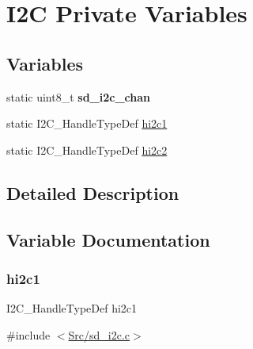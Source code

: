 \hypertarget{group___s_d___i2_c___private___variables}{}\section{I2C Private Variables}
\label{group___s_d___i2_c___private___variables}
\subsection*{Variables}
\begin{DoxyCompactItemize}
\item 
\mbox{\label{group___s_d___i2_c___private___variables_ga7dd7d939b29cc4e7d92bbe2afd68f94a}} 
static uint8\+\_\+t {\bfseries sd\+\_\+i2c\+\_\+chan}
\item 
static I2\+C\+\_\+\+Handle\+Type\+Def \mbox{\hyperlink{group___s_d___i2_c___private___variables_gaf7b2c26e44dadaaa798a5c3d82914ba7}{hi2c1}}
\item 
static I2\+C\+\_\+\+Handle\+Type\+Def \mbox{\hyperlink{group___s_d___i2_c___private___variables_gac379bcc152d860f08b1279fd3e232295}{hi2c2}}
\end{DoxyCompactItemize}


\subsection{Detailed Description}


\subsection{Variable Documentation}
\mbox{\label{group___s_d___i2_c___private___variables_gaf7b2c26e44dadaaa798a5c3d82914ba7}} 
\subsubsection{\texorpdfstring{hi2c1}{hi2c1}}
{\footnotesize\ttfamily I2\+C\+\_\+\+Handle\+Type\+Def hi2c1\hspace{0.3cm}{\ttfamily [static]}}



{\ttfamily \#include $<$\mbox{\hyperlink{sd__i2c_8c}{Src/sd\+\_\+i2c.\+c}}$>$}

